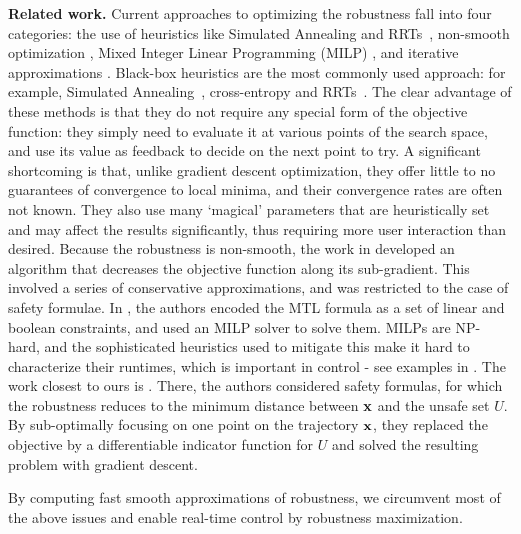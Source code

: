 \textbf{Related work.}
Current approaches to optimizing the robustness fall into four categories: 
the use of heuristics like Simulated Annealing and RRTs~\cite{NghiemSFIGP10hscc,AbbasF_HybridSA12,SankaranarayananF2012hscc,Dreossi15_RRTFalsification,Deshmukh15_IterativeApproaches}, 
non-smooth optimization \cite{AbbasF13acc}, 
Mixed Integer Linear Programming (MILP) \cite{Raman14_MPCSTL}, 
and iterative approximations \cite{AbbasATVA11_LinFalsification,Abbas14_MTLDescent}.
Black-box heuristics are the most commonly used approach: for example, Simulated Annealing~\cite{NghiemSFIGP10hscc}, cross-entropy \cite{SankaranarayananF2012hscc} and RRTs~\cite{Dreossi15_RRTFalsification}.
The clear advantage of these methods is that they do not require any special form of the objective function: they simply need to evaluate it at various points of the search space, and use its value as feedback to decide on the next point to try.
A significant shortcoming is that, unlike gradient descent optimization, they offer little to no guarantees of convergence to local minima, and their convergence rates are often not known. 
They also use many `magical' parameters that are heuristically set and may affect the results significantly, thus requiring more user interaction than desired.
Because the robustness is non-smooth, the work in \cite{AbbasF13acc} developed an algorithm that decreases the objective function along its sub-gradient. 
This involved a series of conservative approximations, and was restricted to the case of safety formulae.
In \cite{Raman14_MPCSTL}, the authors encoded the MTL formula as a set of linear and boolean constraints, and used an MILP solver to solve them.
MILPs are NP-hard, and the sophisticated heuristics used to mitigate this make it hard to characterize their runtimes, which is important in control - see examples in \cite{Raman14_MPCSTL}.
The work closest to ours is \cite{AbbasATVA11_LinFalsification,Abbas14_MTLDescent}.
There, the authors considered safety formulas, for which the robustness reduces to the minimum distance between $\mathbf{x}$ and the unsafe set $U$.
By sub-optimally focusing on one point on the trajectory $\mathbf{x}$, they replaced the objective by a differentiable indicator function for $U$ and solved the resulting problem with gradient descent.

By computing fast smooth approximations of robustness, we circumvent most of the above issues and enable real-time control by robustness maximization.


